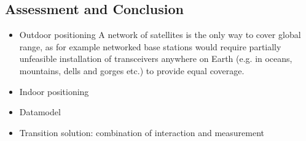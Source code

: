 \subsection{Assessment and Conclusion}
\begin{itemize}
	\item Outdoor positioning
	A network of satellites is the only way to cover global range, as for example networked base stations would require partially unfeasible installation of transceivers anywhere on Earth (e.g. in oceans, mountains, dells and gorges etc.) to provide equal coverage.
	
	
	\item Indoor positioning
	
	\item Datamodel
	
	\item Transition solution: combination of interaction and measurement
	
\end{itemize}